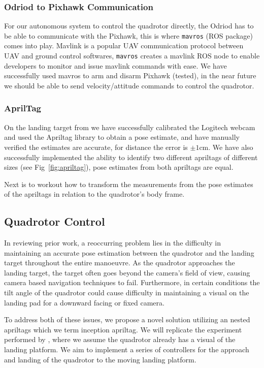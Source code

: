 \documentclass[11pt, twocolumn]{article}
\begin{document}
\subsubsection{Odriod to Pixhawk Communication}
For our autonomous system to control the quadrotor directly, the Odriod has to be able to communicate with the Pixhawk, this is where \verb|mavros| (ROS package) comes into play. Mavlink is a popular UAV communication protocol between UAV and ground control softwares, \verb|mavros| creates a mavlink ROS node to enable developers to monitor and issue mavlink commands with ease. We have successfully used mavros to arm and disarm Pixhawk (tested), in the near future we should be able to send velocity/attitude commands to control the quadrotor.

\subsubsection{AprilTag}
On the landing target from we have successfully calibrated the Logitech webcam and used the Apriltag library to obtain a pose estimate, and have manually verified the estimates are accurate, for distance the error is $\pm 1$cm. We have also successfully implemented the ability to identify two different apriltags of different sizes (see Fig~\ref{fig:apriltag}), pose estimates from both apriltags are equal.

Next is to workout how to transform the measurements from the pose estimates of the apriltags in relation to the quadrotor's body frame.


\subsection{Quadrotor Control}
In reviewing prior work, a reoccurring problem lies in the difficulty in maintaining an accurate pose estimation between the quadrotor and the landing target throughout the entire manoeuvre. As the quadrotor approaches the landing target, the target often goes beyond the camera's field of view, causing camera based navigation techniques to fail. Furthermore, in certain conditions the tilt angle of the quadrotor could cause difficulty in maintaining a visual on the landing pad for a downward facing or fixed camera. 

To address both of these issues, we propose a novel solution utilizing an nested apriltags which we term inception apriltag. We will replicate the experiment performed by \cite{Ling2014}, where we assume the quadrotor already has a visual of the landing platform. We aim to implement a series of controllers for the approach and landing of the quadrotor to the moving landing platform.
\end{document}
